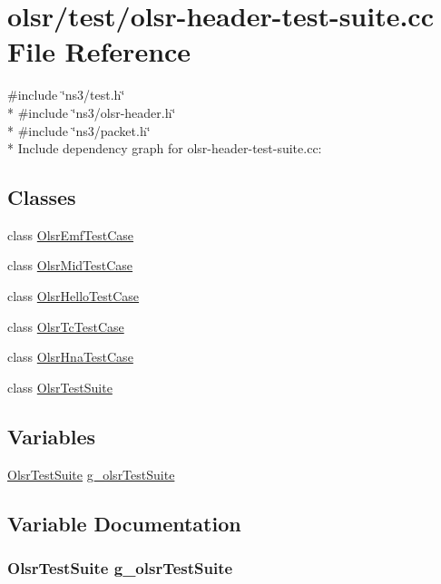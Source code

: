 \hypertarget{olsr-header-test-suite_8cc}{}\section{olsr/test/olsr-\/header-\/test-\/suite.cc File Reference}
\label{olsr-header-test-suite_8cc}
{\ttfamily \#include \char`\"{}ns3/test.\+h\char`\"{}}\\*
{\ttfamily \#include \char`\"{}ns3/olsr-\/header.\+h\char`\"{}}\\*
{\ttfamily \#include \char`\"{}ns3/packet.\+h\char`\"{}}\\*
Include dependency graph for olsr-\/header-\/test-\/suite.cc\+:
\subsection*{Classes}
\begin{DoxyCompactItemize}
\item 
class \hyperlink{classOlsrEmfTestCase}{Olsr\+Emf\+Test\+Case}
\item 
class \hyperlink{classOlsrMidTestCase}{Olsr\+Mid\+Test\+Case}
\item 
class \hyperlink{classOlsrHelloTestCase}{Olsr\+Hello\+Test\+Case}
\item 
class \hyperlink{classOlsrTcTestCase}{Olsr\+Tc\+Test\+Case}
\item 
class \hyperlink{classOlsrHnaTestCase}{Olsr\+Hna\+Test\+Case}
\item 
class \hyperlink{classOlsrTestSuite}{Olsr\+Test\+Suite}
\end{DoxyCompactItemize}
\subsection*{Variables}
\begin{DoxyCompactItemize}
\item 
\hyperlink{classOlsrTestSuite}{Olsr\+Test\+Suite} \hyperlink{olsr-header-test-suite_8cc_a6f5a2918145c17c24a87578ec713e542}{g\+\_\+olsr\+Test\+Suite}
\end{DoxyCompactItemize}


\subsection{Variable Documentation}
\subsubsection[{\texorpdfstring{g\+\_\+olsr\+Test\+Suite}{g_olsrTestSuite}}]{\setlength{\rightskip}{0pt plus 5cm} {\bf Olsr\+Test\+Suite}  g\+\_\+olsr\+Test\+Suite\hspace{0.3cm}{\ttfamily [static]}}\hypertarget{olsr-header-test-suite_8cc_a6f5a2918145c17c24a87578ec713e542}{}\label{olsr-header-test-suite_8cc_a6f5a2918145c17c24a87578ec713e542}
